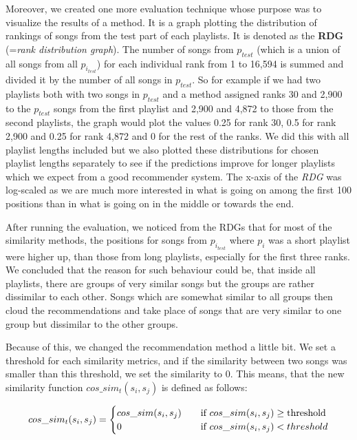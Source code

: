 Moreover, we created one more evaluation technique whose purpose was to visualize the results of a method. It is a graph plotting the distribution of rankings of songs from the test part of each playlists. It is denoted as the \textbf{RDG} (=\textit{rank distribution graph}). The number of songs from $p_{test}$ (which is a union of all songs from all $p_{i_{test}}$) for each individual rank from 1 to 16,594 is summed and divided it by the number of all songs in $p_{test}$. So for example if we had two playlists both with two songs in $p_{test}$ and a method assigned ranks 30 and 2,900 to the $p_{test}$ songs from the first playlist and 2,900 and 4,872 to those from the second playlists, the graph would plot the values 0.25 for rank 30, 0.5 for rank 2,900 and 0.25 for rank 4,872 and 0 for the rest of the ranks. We did this with all playlist lengths included but we also plotted these distributions for chosen playlist lengths separately to see if the predictions improve for longer playlists which we expect from a good recommender system. The x-axis of the \textit{RDG} was log-scaled as we are much more interested in what is going on among the first 100 positions than in what is going on in the middle or towards the end. 
    
After running the evaluation, we noticed from the RDGs that for most of the similarity methods, the positions for songs from $p_{i_{test}} $ where $p_i$ was a short playlist were higher up, than those from long playlists, especially for the first three ranks. We concluded that the reason for such behaviour could be, that inside all playlists, there are groups of very similar songs but the groups are rather dissimilar to each other. Songs which are somewhat similar to all groups then cloud the recommendations and take place of songs that are very similar to one group but dissimilar to the other groups.

Because of this, we changed the recommendation method a little bit. We set a threshold for each similarity metrics, and if the similarity between two songs was smaller than this threshold, we set the similarity to 0. This means, that the new similarity function $cos\_sim_t(s_i,s_j)$ is defined as follows:

\[   
cos\_sim_t(s_i,s_j) = 
     \begin{cases}
       \text{$ cos\_sim(s_i,s_j) $} &\quad\text{if $ cos\_sim(s_i,s_j)$} \geq \text{threshold}\\
       \text{$ 0 $} &\quad\text{if $ cos\_sim(s_i,s_j)  < threshold$}\\
     \end{cases}
\]

